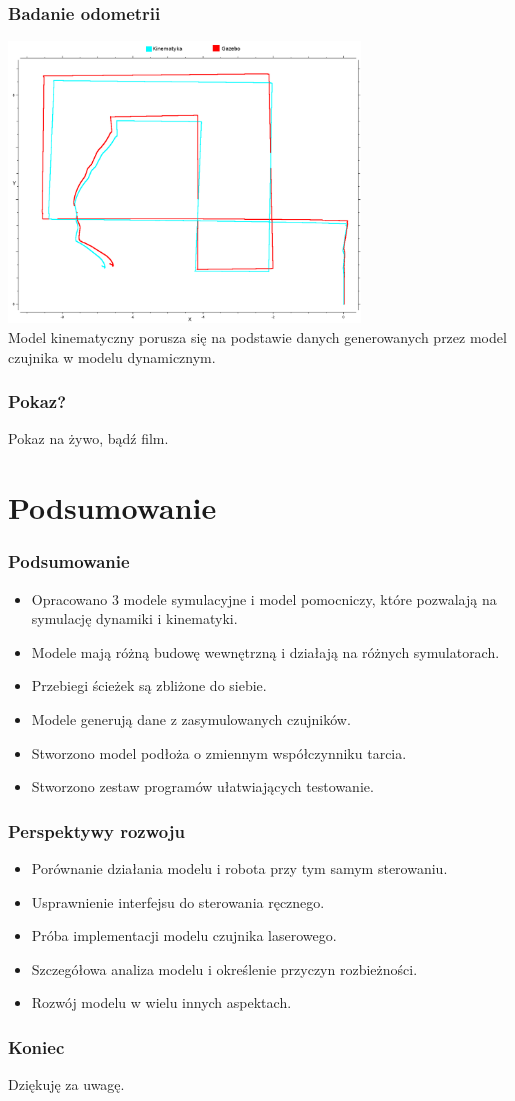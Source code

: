 \documentclass{beamer}
\begin{document}
	\begin{frame}
		\frametitle{Badanie odometrii}
		\centering
		\includegraphics[width=0.7\textwidth]{graphics/reen_1.png} \\
		Model kinematyczny porusza się na podstawie danych generowanych przez model czujnika w modelu dynamicznym.
	\end{frame}
	\begin{frame}
		\frametitle{Pokaz?}
		Pokaz na żywo, bądź film.
	\end{frame}
 
	\section{Podsumowanie}
	\begin{frame}
		\frametitle{Podsumowanie}
		\begin{itemize}
			\item Opracowano 3 modele symulacyjne i model pomocniczy, które pozwalają na symulację dynamiki i kinematyki.
			\item Modele mają różną budowę wewnętrzną i działają na różnych symulatorach.
			\item Przebiegi ścieżek są zbliżone do siebie.
			\item Modele generują dane z zasymulowanych czujników.
			\item Stworzono model podłoża o zmiennym współczynniku tarcia.
			\item Stworzono zestaw programów ułatwiających testowanie.
		\end{itemize}
	\end{frame}
	\begin{frame}
		\frametitle{Perspektywy rozwoju}
		\begin{itemize}
			\item Porównanie działania modelu i robota przy tym samym sterowaniu.
			\item Usprawnienie interfejsu do sterowania ręcznego.
			\item Próba implementacji modelu czujnika laserowego.
			\item Szczegółowa analiza modelu i określenie przyczyn rozbieżności.
			\item Rozwój modelu w wielu innych aspektach.
		\end{itemize}
	\end{frame}
	\begin{frame}
		\frametitle{Koniec}
		\centering
		Dziękuję za uwagę.
	\end{frame}
\end{document}
